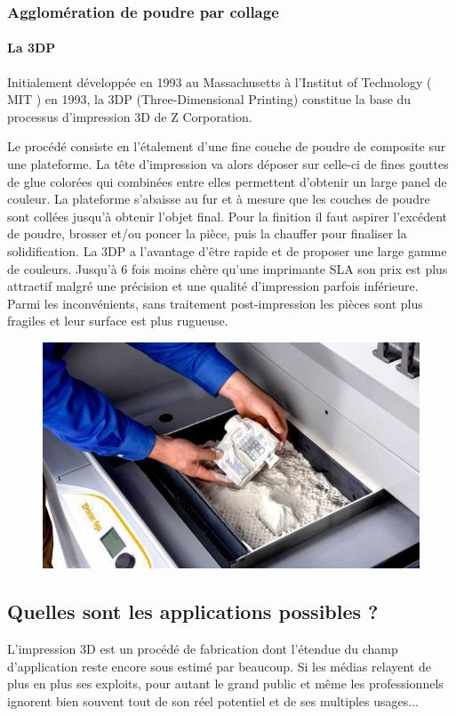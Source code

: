 \documentclass{article}
\begin{document}
\subsubsection{Agglomération de poudre par collage}
\paragraph{La 3DP} \hfill

Initialement développée en 1993 au Massachusetts à l'Institut of Technology ( MIT ) en 1993, la 3DP (Three-Dimensional Printing) constitue la base du processus d'impression 3D de Z Corporation. \hfill

Le procédé consiste en l'étalement d'une fine couche de poudre de composite sur une plateforme. La tête d'impression va alors déposer sur celle-ci de fines gouttes de glue colorées qui combinées entre elles permettent d'obtenir un large panel de couleur. La plateforme s'abaisse au fur et à mesure que les couches de poudre sont collées jusqu'à obtenir l'objet final. Pour la finition il faut aspirer l'excédent de poudre, brosser et/ou poncer la pièce, puis la chauffer pour finaliser la solidification. La 3DP a l'avantage d'être rapide et de proposer une large gamme de couleurs. Jusqu'à 6 fois moins chère qu'une imprimante SLA son prix est plus attractif malgré une précision et une qualité d'impression parfois inférieure. Parmi les inconvénients, sans traitement post-impression les pièces sont plus fragiles et leur surface est plus rugueuse. 
\begin{figure}[h!]
\centering
\includegraphics[scale=0.4]{./images/zprinter-650.png}
\end{figure}
\newpage
\subsection{Quelles sont les applications possibles ?}
L'impression 3D est un procédé de fabrication dont l'étendue du champ d'application reste encore sous estimé par beaucoup. Si les médias relayent de plus en plus ses exploits, pour autant le grand public et même les professionnels ignorent bien souvent tout de son réel potentiel et de ses multiples usages...\hfill
\end{document}
